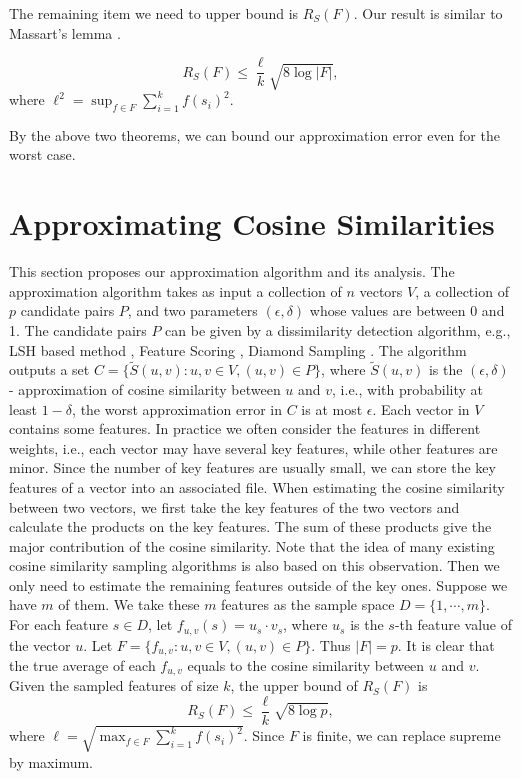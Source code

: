 \documentclass{article}
\begin{document}
The remaining item we need to upper bound is $R_S(F)$. Our result is similar to Massart's lemma \cite{AGO14}.

\begin{theorem}
\label{thm2}
$$R_S(F) \leq \frac{\ell}{k}\sqrt{8\log |F|},$$
where $\ell^2 = \sup_{f\in F}\sum_{i=1}^k f(s_i)^2$.
\end{theorem}

By the above two theorems, we can bound our approximation error even for the worst case.


\section{Approximating Cosine Similarities}
\label{sec:acs}
This section proposes our approximation algorithm and its analysis.
{\color{black}
The approximation algorithm takes as input a collection of $n$ vectors $V$, a collection of $p$ candidate pairs $P$, and two parameters $(\epsilon, \delta)$ whose values are between 0 and 1. The candidate pairs $P$ can be given by a dissimilarity detection algorithm, e.g., LSH based method \cite{LRU14}, Feature Scoring \cite{CL99}, Diamond Sampling \cite{BKP15}. The algorithm outputs a set $C = \{\tilde{S}(u,v): u,v \in V, (u,v)\in P\}$, where $\tilde{S}(u,v)$ is the $(\epsilon, \delta)$- approximation of cosine similarity between $u$ and $v$, i.e., with probability at least $1-\delta$, the worst approximation error in $C$ is at most $\epsilon$. Each vector in $V$ contains some features. In practice we often consider the features in different weights, i.e., each vector may have several key features, while other features are minor. Since the number of key features are usually small, we can store the key features of a vector into an associated file. When estimating the cosine similarity between two vectors, we first take the key features of the two vectors and calculate the products on the key features. The sum of these products give the major contribution of the cosine similarity. Note that the idea of many existing cosine similarity sampling algorithms \cite{CL99,BKP15} is also based on this observation. Then we only need to estimate the remaining features outside of the key ones. Suppose we have $m$ of them. We take these $m$ features as the sample space $D = \{1,\cdots,m\}$. For each feature $s\in D$, let $f_{u,v}(s) = u_s\cdot v_s$, where $u_s$ is the $s$-th feature value of the vector $u$. Let $F = \{f_{u,v}: u,v\in V, (u,v)\in P\}$. Thus $|F| = p$. It is clear that the true average of each $f_{u,v}$ equals to the cosine similarity between $u$ and $v$. Given the sampled features of size $k$, the upper bound of $R_S(F)$ is 
$$R_S(F) \leq \frac{\ell}{k}\sqrt{8\log p},$$
where $\ell = \sqrt{\max_{f\in F} \sum_{i=1}^k f(s_i)^2}$. Since $F$ is finite, we can replace supreme by maximum. 
}
\end{document}

